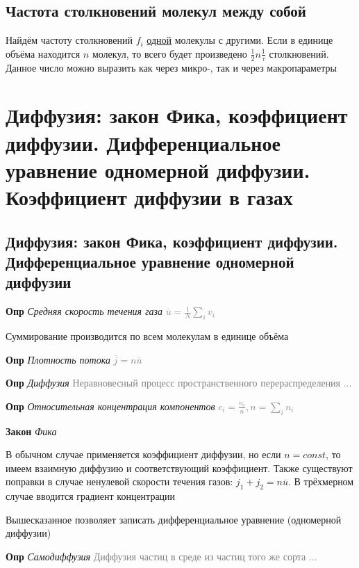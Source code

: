 \documentclass[a4paper, 14pt]{article}
\begin{document}
    \subsection{Частота столкновений молекул между собой}

    Найдём частоту столкновений $f_i$ \underline{одной} молекулы с другими.
    Если в единице объёма находится $n$ молекул, то всего будет произведено $\frac{1}{2}n \frac{1}{\tau}$ столкновений.
    Данное число можно выразить как через микро-, так и через макропараметры

    \section{Диффузия: закон Фика, коэффициент диффузии. Дифференциальное уравнение одномерной диффузии.
    Коэффициент диффузии в газах}

    \subsection{Диффузия: закон Фика, коэффициент диффузии. Дифференциальное уравнение одномерной диффузии}

    \textbf{Опр} \textit{Средняя скорость течения газа} \textcolor{gray}{$\overline{u} = \frac{1}{N} \sum_i v_i$}

    Суммирование производится по всем молекулам в единице объёма

    \textbf{Опр} \textit{Плотность потока} \textcolor{gray}{$\overline{j} = n\overline{u}$}

    \textbf{Опр} \textit{Диффузия} \textcolor{gray}{Неравновесный процесс пространственного перераспределения ...}

    \textbf{Опр} \textit{Относительная концентрация компонентов} \textcolor{gray}{$c_i = \frac{n_i}{n}, n = \sum_i n_i$}

    \textbf{Закон} \textit{Фика}

    В обычном случае применяется коэффициент диффузии, но если $n = const$, то имеем взаимную диффузию и
    соответствующий коэффициент.
    Также существуют поправки в случае ненулевой скорости течения газов: $j_1 + j_2 = n \overline{u}$.
    В трёхмерном случае вводится градиент концентрации

    Вышесказанное позволяет записать дифференциальное уравнение (одномерной диффузии)

    \textbf{Опр} \textit{Самодиффузия} \textcolor{gray}{Диффузия частиц в среде из частиц того же сорта ...}
\end{document}
